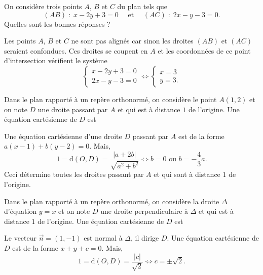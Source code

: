 \begin{question}
On considère trois points $A$, $B$ et $C$ du plan tels que
$$(AB)\; : \; x-2y+3=0\quad \mbox{ et }\quad (AC)\; : \; 2x-y-3=0.$$
Quelles sont les bonnes réponses ?
\begin{answers}  
\end{answers}
\begin{explanations}
Les points $A$, $B$ et $C$ ne sont pas alignés car sinon les droites $(AB)$ et $(AC)$ seraient confondues. Ces droites se coupent en $A$ et les coordonnées de ce point d'intersection vérifient le système 
$$\left\{\begin{array}{l}x-2y+3=0\\ 2x-y-3=0
\end{array}\right. \Leftrightarrow \left\{\begin{array}{l}x=3\\ y=3.\end{array}\right.$$
\end{explanations}
\end{question}


\begin{question}
Dans le plan rapporté à un repère orthonormé, on considère le point $\displaystyle A(1,2)$ et on note $D$ une droite passant par $A$ et qui est à distance $1$ de l'origine. Une équation cartésienne de $D$ est
\begin{answers}  
\end{answers}
\begin{explanations}
Une équation cartésienne d'une droite $D$ passant par $A$ est de la forme $a(x-1)+b(y-2)=0$. Mais,
$$1=\mbox{d}(O,D)=\frac{|a+2b|}{\sqrt{a^2+b^2}}\Leftrightarrow b=0\mbox{ ou }b=-\frac{4}{3}a.$$
Ceci détermine toutes les droites passant par $A$ et qui sont à distance $1$ de l'origine.
\end{explanations}
\end{question}


\begin{question}
Dans le plan rapporté à un repère orthonormé, on considère la droite $\Delta$ d'équation $y=x$ et on note $D$ une droite perpendiculaire à $\Delta$ et qui est à distance $1$ de l'origine. Une équation cartésienne de $D$ est
\begin{answers}  
\end{answers}
\begin{explanations}
Le vecteur $\vec{n}=(1,-1)$ est normal à $\Delta$, il dirige $D$. Une équation cartésienne de $D$ est de la forme $x+y+c=0$. Mais,
$$1=\mbox{d}(O,D)=\frac{|c|}{\sqrt{2}}\Leftrightarrow c=\pm \sqrt{2}.$$
\end{explanations}
\end{question}


